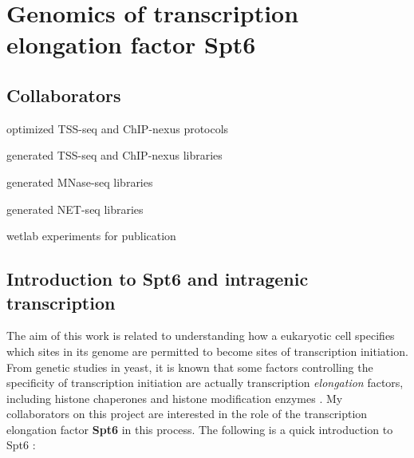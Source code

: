 \chapter{Genomics of transcription elongation factor Spt6}

\section{Collaborators}

\begin{description}[align=right, labelwidth=5cm, noitemsep]
    \item [Steve Doris] optimized TSS-seq and ChIP-nexus protocols
    \item [] generated TSS-seq and ChIP-nexus libraries
    \item [Olga Viktorovskaya] generated MNase-seq libraries
    \item [Magdalena Murawska] generated NET-seq libraries
    \item [Dan Spatt] wetlab experiments for publication
\end{description}

\section{Introduction to Spt6 and intragenic transcription}

The aim of this work is related to understanding how a eukaryotic cell specifies which sites in its genome are permitted to become sites of transcription initiation.
From genetic studies in yeast, it is known that some factors controlling the specificity of transcription initiation are actually transcription \textit{elongation} factors, including histone chaperones and histone modification enzymes \citep{kaplan2003, cheung2008, hennig2013}.
My collaborators on this project are interested in the role of the transcription elongation factor \textbf{Spt6} in this process.
The following is a quick introduction to Spt6 \citep{doris2018}:

